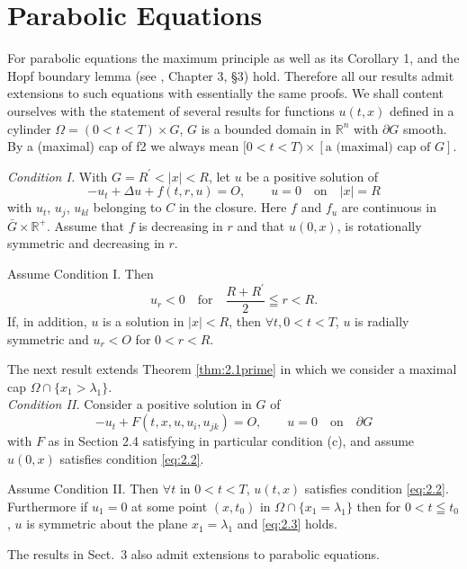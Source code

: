 \section{Parabolic Equations}\label{sec:5}

For parabolic equations the maximum principle as well as its Corollary 1,
and the Hopf boundary lemma (see \cite{protter_maximum_1984}, Chapter 3, \S 3) hold.
Therefore all our results admit extensions to such equations with essentially the same proofs.
We shall content ourselves with the statement of several results for functions $u(t, x)$ 
defined in a cylinder $\Omega = (0 < t < T) \times G$, $G$ is a bounded domain in $\mathbb{R}^n$ 
with $\partial G$ smooth. 
By a (maximal) cap of f2 we always mean $[0 < t < T) \times [\text{a (maximal) cap of }G]$.

\noindent
\textit{Condition I. }With $G=R^{\prime}< |x| <R$, let $u$ be a positive solution of
\begin{equation}\label{eq:5.1}
	-u_t+\Delta u+f(t,r,u)=O, \qquad u=0 \quad \text{on}\quad |x|=R
\end{equation}
with $u_t$, $u_j$, $u_{kl}$ belonging to $C$ in the closure. Here $f$ and $f_u$ are continuous in $\bar{G}\times\mathbb{R}^+$. Assume that $f$ is decreasing in $r$ and that $u(0, x)$, is rotationally symmetric and decreasing in $r$.
\begin{theorem}\label{thm:5.1}
	Assume Condition I. Then
	\[u_r<0\quad \text{for}\quad \frac{R+R^{\prime}}{2} \leqq r <R.\]
	If, in addition, $u$ is a solution in $|x| <R$, then $\forall t, 0<t<T$, $u$ is radially symmetric and $u_r<O$ for $0<r<R$.
\end{theorem}

The next result extends Theorem \ref{thm:2.1prime} in which we consider a maximal cap $\Omega\cap\{x_1 > \lambda_1 \}$.\\

\noindent
\textit{Condition II. }Consider a positive solution in $G$ of
\[-u_t+F(t,x,u, u_i, u_{jk})=O,\qquad u=0 \quad\text{on}\quad \partial G\]
with $F$ as in Section 2.4 satisfying in particular condition (c), and assume $u(0, x)$ satisfies condition \eqref{eq:2.2}.
\begin{theorem}\label{thm:5.2}
	Assume Condition II. Then $\forall t$ in $0<t<T$, $u(t,x)$ satisfies condition \eqref{eq:2.2}. Furthermore if $u_1=0$ at some point $(x, t_0)$ in $\Omega\cap\{x_1=\lambda_1\}$ then for $0<t\leqq t_0$, $u$ is symmetric about the plane $x_1 =\lambda_1$ and \eqref{eq:2.3} holds.
\end{theorem}

The results in Sect.~3 also admit extensions to parabolic equations.